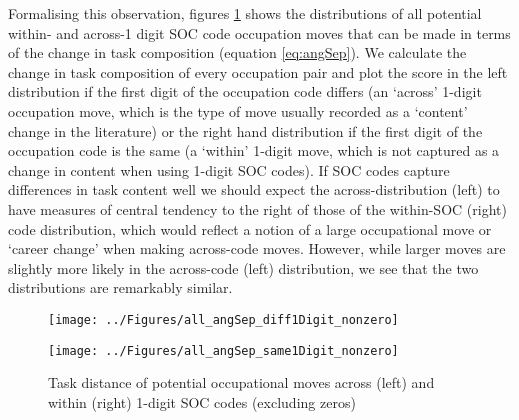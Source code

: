 \documentclass[11pt, oneside]{article}
\begin{document}
	Formalising this observation, figures \ref{fig:angSep_diff} shows the distributions of all potential within- and across-1 digit SOC code occupation moves that can be made in terms of the change in task composition (equation \ref{eq:angSep}). We calculate the change in task composition of every occupation pair and plot the score in the left distribution if the first digit of the occupation code differs (an `across' 1-digit occupation move, which is the type of move usually recorded as a `content' change in the literature) or the right hand distribution if the first digit of the occupation code is the same (a `within' 1-digit move, which is not captured as a change in content when using 1-digit SOC codes). If SOC codes capture differences in task content well we should expect the across-distribution (left) to have measures of central tendency to the right of those of the within-SOC (right) code distribution, which would reflect a notion of a large occupational move or `career change' when making across-code moves. However, while larger moves are slightly more likely in the across-code (left) distribution, we see that the two distributions are remarkably similar. 
	
	\begin{figure}[H]
		\centering
		\begin{minipage}{.5\textwidth}
			\centering
			\texttt{[image: ../Figures/all\_angSep\_diff1Digit\_nonzero]}
		\end{minipage}%
		\begin{minipage}{.5\textwidth}
			\centering
			\texttt{[image: ../Figures/all\_angSep\_same1Digit\_nonzero]}
		\end{minipage}%
		\caption{Task distance of potential occupational moves across (left) and within (right) 1-digit SOC codes (excluding zeros)}
		\label{fig:angSep_diff}
	\end{figure}
	
	
	\begin{table}[H]
		\centering
		 
		\caption{Quantiles of task similarity of potential occupational moves across (left) and within (right) 1-digit SOC codes (including zeros)}
		\label{fig:angSep_quantile_diff_same}
	\end{table}
	
	
	
	
	
\end{document}
